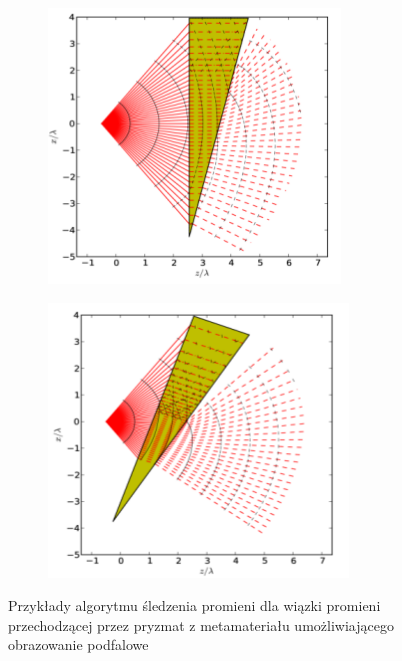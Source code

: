 \begin{figure}
	\centering
	\begin{subfigure}{.45\textwidth}
		\includegraphics[width=\textwidth]{images/multilayer/prism-ray-tracing1.png}
	\end{subfigure}
	\begin{subfigure}{.45\textwidth}
		\includegraphics[width=\textwidth]{images/multilayer/prism-ray-tracing2.png}
	\end{subfigure}
	\caption{Przykłady algorytmu śledzenia promieni dla wiązki promieni przechodzącej przez pryzmat z metamateriału umożliwiającego obrazowanie podfalowe~\cite{pastuszczak2011slanted}} 
\end{figure}

